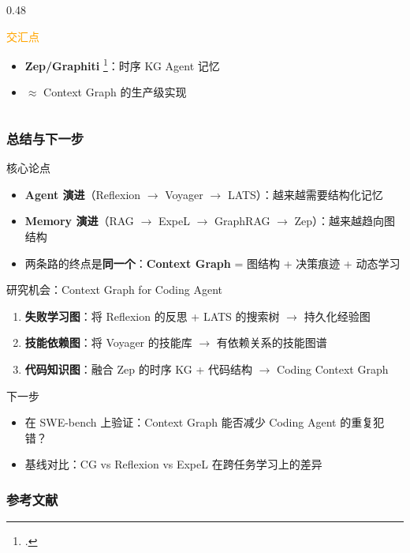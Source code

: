 \documentclass[aspectratio=169,10pt]{beamer}
\let\oldcite\cite
\renewcommand{\cite}[1]{\oldcite{#1}\footcitetext{#1}}
\begin{document}
\begin{frame}
\begin{columns}[T]
\begin{column}{0.48\textwidth}
      \begin{block}{\textcolor{orange}{交汇点}}
        \small
        \begin{itemize}
          \item \textbf{Zep/Graphiti} \cite{rasmussen2025zep}：时序 KG Agent 记忆
          \item $\approx$ Context Graph 的生产级实现
        \end{itemize}
      \end{block}
    \end{column}
  \end{columns}
\end{frame}

\begin{frame}
  \frametitle{总结与下一步}

  \begin{block}{核心论点}
    \begin{itemize}
      \item \textbf{Agent 演进}（Reflexion $\rightarrow$ Voyager $\rightarrow$ LATS）：越来越需要结构化记忆
      \item \textbf{Memory 演进}（RAG $\rightarrow$ ExpeL $\rightarrow$ GraphRAG $\rightarrow$ Zep）：越来越趋向图结构
      \item 两条路的终点是\textbf{同一个}：\textbf{Context Graph} = 图结构 + 决策痕迹 + 动态学习
    \end{itemize}
  \end{block}

  \begin{block}{研究机会：Context Graph for Coding Agent}
    \begin{enumerate}
      \item \textbf{失败学习图}：将 Reflexion 的反思 + LATS 的搜索树 $\rightarrow$ 持久化经验图
      \item \textbf{技能依赖图}：将 Voyager 的技能库 $\rightarrow$ 有依赖关系的技能图谱
      \item \textbf{代码知识图}：融合 Zep 的时序 KG + 代码结构 $\rightarrow$ Coding Context Graph
    \end{enumerate}
  \end{block}

  \begin{alertblock}{下一步}
    \begin{itemize}
      \item 在 SWE-bench 上验证：Context Graph 能否减少 Coding Agent 的重复犯错？
      \item 基线对比：CG vs Reflexion vs ExpeL 在跨任务学习上的差异
    \end{itemize}
  \end{alertblock}
\end{frame}

\begin{frame}[allowframebreaks]
  \frametitle{参考文献}
  \printbibliography
\end{frame}
\end{document}
